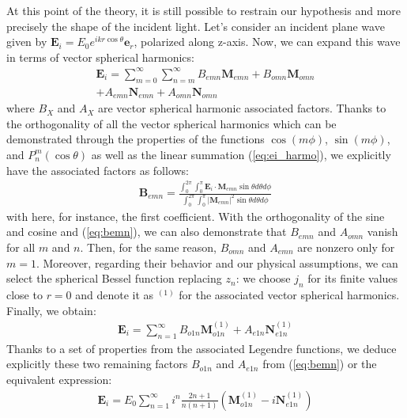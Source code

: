 \documentclass{article}
\numberwithin{equation}{section}
\begin{document}
At this point of the theory, it is still possible to restrain our hypothesis and more precisely the shape of the incident light. Let's consider an incident plane wave given by $\textbf{E}_{i}=E_{0}e^{ikr\cos\theta}\textbf{e}_{r}$, polarized along z-axis. Now, we can expand this wave in terms of vector spherical harmonics:
\begin{equation}\label{eq:ei_harmo}
\begin{aligned}
\textbf{E}_{i}=\sum_{m=0}^{\infty }\sum_{n=m}^{\infty }B_{emn}\textbf{M}_{emn}+B_{omn}\textbf{M}_{omn}\\
+A_{emn}\textbf{N}_{emn}+A_{omn}\textbf{N}_{omn}
\end{aligned}
\end{equation}
where $B_{X}$ and $A_{X}$ are vector spherical harmonic associated factors. Thanks to the orthogonality of all the vector spherical harmonics which can be demonstrated through the properties of the functions $\cos(m\phi)$, $\sin(m\phi)$, and $P_{n}^{m}(\cos\theta)$ as well as the linear summation (\ref{eq:ei_harmo}), we explicitly have the associated factors as follows:
\begin{align}\label{eq:bemn}
\textbf{B}_{emn}=\frac{\int_{0}^{2\pi}\int_{0}^{\pi}\textbf{E}_{i}\cdot \textbf{M}_{emn}\sin\theta d\theta d\phi}{\int_{0}^{2\pi}\int_{0}^{\pi}|\textbf{M}_{emn}|^{2}\sin\theta d\theta d\phi}
\end{align}
with here, for instance, the first coefficient. With the orthogonality of the sine and cosine and (\ref{eq:bemn}), we can also demonstrate that $B_{emn}$ and $A_{omn}$ vanish for all $m$ and $n$. Then, for the same reason, $B_{omn}$ and $A_{emn}$ are nonzero only for $m=1$. Moreover, regarding their behavior and our physical assumptions, we can select the spherical Bessel function replacing $z_{n}$: we choose $j_{n}$ for its finite values close to $r=0$ and denote it as $^{(1)}$ for the associated vector spherical harmonics. Finally, we obtain:
\begin{align}
\textbf{E}_{i}=\sum_{n=1}^{\infty }B_{o1n}\textbf{M}^{(1)}_{o1n} + A_{e1n}\textbf{N}^{(1)}_{e1n}
\end{align}
Thanks to a set of properties from the associated Legendre functions, we deduce explicitly these two remaining factors $B_{o1n}$ and $A_{e1n}$ from (\ref{eq:bemn}) or the equivalent expression:
\begin{align}
\textbf{E}_{i}=E_{0}\sum_{n=1}^{\infty }i^{n}\frac{2n+1}{n(n+1)}(\textbf{M}^{(1)}_{o1n} - i\textbf{N}^{(1)}_{e1n})
\end{align}
\end{document}
